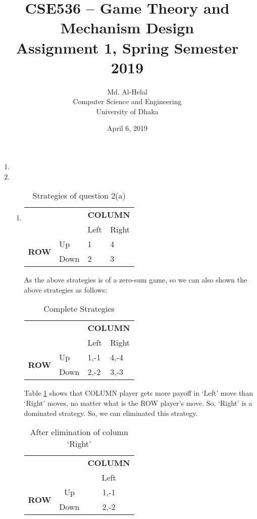 \documentclass[a4paper,12pt]{article}
\author{Md. Al-Helal\\Computer Science and Engineering\\University of Dhaka}
\title{CSE536 – Game Theory and Mechanism Design\\ 
Assignment 1, Spring Semester 2019}
\date{April 6, 2019}
\begin{document}
\maketitle
\begin{enumerate}
\item
\item%
\begin{enumerate}
\item%
\begin{table}[H]
\centering
\begin{tabular}{@{}llll@{}}
\toprule
& & \multicolumn{2}{c}{\bfseries COLUMN}\\
& & Left & Right\\
\multirow{2}{*}{\bfseries ROW} & Up & 1 & 4\\
 & Down & 2 & 3\\
\bottomrule
\end{tabular}
\caption{Strategies of question 2(a)}
\end{table}

As the above strategies is of a zero-sum game, so we can also shown the above strategies as follows:

\begin{table}[H]
\centering
\begin{tabular}{@{}llll@{}}
\toprule
& & \multicolumn{2}{c}{\bfseries COLUMN}\\
& & Left & Right\\
\multirow{2}{*}{\bfseries ROW} & Up & 1,-1 & 4,-4\\
 & Down & 2,-2 & 3,-3\\
\bottomrule
\end{tabular}
\caption{Complete Strategies}
\label{tab:completea}
\end{table}

Table \ref{tab:completea} shows that COLUMN player gets more payoff in `Left' move than `Right' moves, no matter what is the ROW player's move. So, `Right' is a dominated strategy. So, we can eliminated this strategy.

\begin{table}[H]
\centering
\begin{tabular}{@{}ccc@{}}
\toprule
& & \multicolumn{1}{c}{\bfseries COLUMN}\\
& & Left\\
\multirow{2}{*}{\bfseries ROW} & Up & 1,-1\\
 & Down & 2,-2\\
\bottomrule
\end{tabular}
\caption{After elimination of column `Right'}
\end{table}


\end{enumerate}
\end{enumerate}
\end{document}
